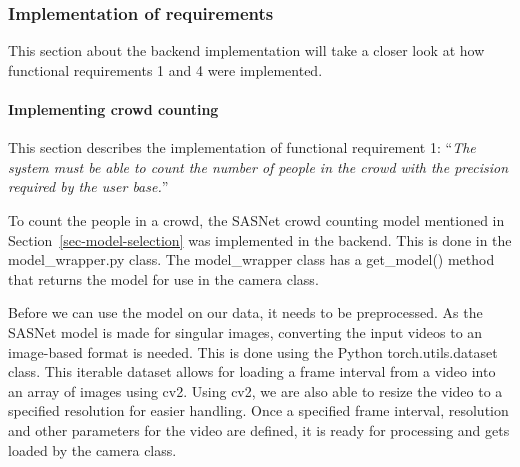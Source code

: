 \documentclass[
]{article}
\begin{document}
\hypertarget{sec-req-imp}{%
\subsubsection{Implementation of requirements}\label{sec-req-imp}}

This section about the backend implementation will take a closer look at
how functional requirements 1 and 4 were implemented.

\hypertarget{sec-crowdcount-implement}{%
\paragraph{Implementing crowd counting}\label{sec-crowdcount-implement}}

This section describes the implementation of functional requirement 1:
``\emph{The system must be able to count the number of people in the
crowd with the precision required by the user base.}''

To count the people in a crowd, the SASNet crowd counting model
mentioned in Section~\ref{sec-model-selection} was implemented in the
backend. This is done in the model\_wrapper.py class. The model\_wrapper
class has a get\_model() method that returns the model for use in the
camera class.

Before we can use the model on our data, it needs to be preprocessed. As
the SASNet model is made for singular images, converting the input
videos to an image-based format is needed. This is done using the Python
torch.utils.dataset class. This iterable dataset allows for loading a
frame interval from a video into an array of images using cv2. Using
cv2, we are also able to resize the video to a specified resolution for
easier handling. Once a specified frame interval, resolution and other
parameters for the video are defined, it is ready for processing and
gets loaded by the camera class.
\end{document}
